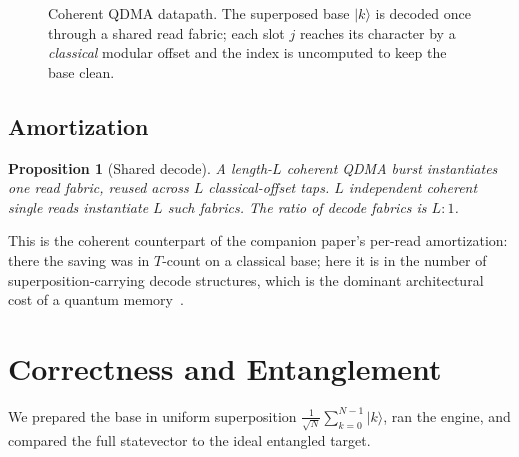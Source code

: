 \documentclass[11pt]{article}
\newtheorem{proposition}{Proposition}
\theoremstyle{definition}
\begin{document}
\begin{figure}[t]
\centering
{}
\caption{Coherent QDMA datapath. The superposed base $\lvert k\rangle$ is decoded
once through a shared read fabric; each slot $j$ reaches its character by a
\emph{classical} modular offset and the index is uncomputed to keep the base clean.}
\label{fig:arch}
\end{figure}

\subsection{Amortization}
\begin{proposition}[Shared decode]
\label{prop:shared}
A length-$L$ coherent QDMA burst instantiates one read fabric, reused across $L$
classical-offset taps. $L$ independent coherent single reads instantiate $L$ such
fabrics. The ratio of decode fabrics is $L{:}1$.
\end{proposition}
\noindent This is the coherent counterpart of the companion paper's per-read
amortization: there the saving was in $T$-count on a classical base; here it is in
the number of superposition-carrying decode structures, which is the dominant
architectural cost of a quantum memory~\cite{giovannetti2008architectures,
dimatteo2020faulttolerant}.

\section{Correctness and Entanglement}
\label{sec:verify}
We prepared the base in uniform superposition $\tfrac{1}{\sqrt N}\sum_{k=0}^{N-1}
\lvert k\rangle$, ran the engine, and compared the full statevector to the ideal
entangled target.
\end{document}
